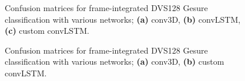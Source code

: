 \begin{figure}[htb]%
    \centering
    \qquad
    \qquad
    \caption{Confusion matrices for frame-integrated  DVS128 Gesure classification with various networks; \textbf{(a)} conv3D, \textbf{(b)} convLSTM, \textbf{(c)} custom convLSTM.}%
    \label{fig:dvs128_c_matrices}%
\end{figure}

\begin{figure}[htb]%
    \centering
    \qquad
    \caption{Confusion matrices for frame-integrated  DVS128 Gesure classification with various networks; \textbf{(a)} conv3D, \textbf{(b)} custom convLSTM.}%
    \label{fig:dvs128_recon_c_matrices}%
\end{figure}

